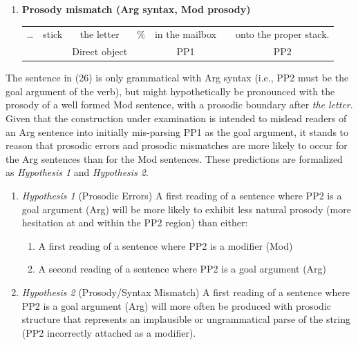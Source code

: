 \documentclass[12pt,oneside]{book}
\providecommand{\tightlist}{%
  \setlength{\itemsep}{0pt}\setlength{\parskip}{0pt}}
\begin{document}
\singlespacing

\begin{enumerate}
\def\labelenumi{(\arabic{enumi})}
\setcounter{enumi}{25}
\tightlist
\item
  \textbf{Prosody mismatch (Arg syntax, Mod prosody)}
  \begingroup
  \setlength{\tabcolsep}{2pt}

  \begin{tabular}{ccccccc}
    \dots & stick & the letter & $\%$ & in the mailbox & & onto the proper stack. \\
    & & \footnotesize Direct object & & \footnotesize PP1 & & \footnotesize PP2 \\
  \end{tabular}
    \endgroup
\end{enumerate}

\doublespacing

The sentence in (26) is only grammatical with Arg syntax (i.e., PP2 must be the goal argument of the verb), but might hypothetically be pronounced with the prosody of a well formed Mod sentence, with a prosodic boundary after \emph{the letter}. Given that the construction under examination is intended to mislead readers of an Arg sentence into initially mis-parsing PP1 as the goal argument, it stands to reason that prosodic errors and prosodic mismatches are more likely to occur for the Arg sentences than for the Mod sentences. These predictions are formalized as \emph{Hypothesis 1} and \emph{Hypothesis 2}.

\begin{enumerate}
\def\labelenumi{(\arabic{enumi})}
\setcounter{enumi}{26}
\tightlist
\item
  \emph{Hypothesis 1} (Prosodic Errors)\linebreak\nopagebreak
  A first reading of a sentence where PP2 is a goal argument (Arg) will be more likely to exhibit less natural prosody (more hesitation at and within the PP2 region) than either:

  \begin{enumerate}
  \def\labelenumii{\alph{enumii}.}
  \tightlist
  \item
    A first reading of a sentence where PP2 is a modifier (Mod)
  \item
    A second reading of a sentence where PP2 is a goal argument (Arg)
  \end{enumerate}
\item
  \emph{Hypothesis 2} (Prosody/Syntax Mismatch)\linebreak\nopagebreak
  A first reading of a sentence where PP2 is a goal argument (Arg) will more often be produced with prosodic structure that represents an implausible or ungrammatical parse of the string (PP2 incorrectly attached as a modifier).
\end{enumerate}
\end{document}
